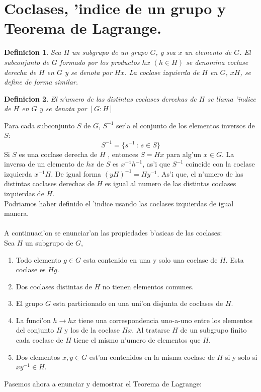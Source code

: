 \documentclass[a4paper,openright,12pt]{report}
\numberwithin{equation}{section} %
\newtheorem{definicion}{Definicion}[section] %
\begin{document}
\section{Coclases, 'indice de un grupo y Teorema de Lagrange.}
\begin{definicion}
Sea $H$ un subgrupo de un grupo $G$, y sea $x$ un elemento de $G$. El subconjunto de $G$ formado por los productos $hx$ $(h \in H)$ se denomina coclase derecha de $H$ en $G$ y se denota por $Hx$. La coclase izquierda de $H$ en $G$, $xH$, se define de forma similar. 
\end{definicion}
\begin{definicion}
El n'umero de las distintas coclases derechas de $H$ se llama 'indice de $H$ en $G$ y se denota por $[ G:H ]$
\end{definicion}
Para cada subconjunto $S$ de $G$, $S^{-1}$ ser'a el conjunto de los elementos inversos de $S$:
\[
S^{-1}= \{ s^{-1}\,:\, s \in S \}
\]
Si $S$ es una coclase derecha de $H$ , entonces $S=Hx$ para alg'un $x \in G$. La inversa de un elemento de $hx$ de $S$ es $x^{-1}h^{-1}$, as'i que $S^{-1}$  coincide con la coclase izquierda $x^{-1}H$. De igual forma $(yH)^{-1} = Hy^{-1}$. As'i que, el n'umero de las distintas coclases derechas de $H$ es igual al numero de las distintas coclases izquierdas de $H$.\\
Podriamos haber definido el 'indice usando las coclases izquierdas de igual manera.\\
\\
A continuaci'on se enunciar'an las propiedades b'asicas de las coclases:
\\
Sea $H$ un subgrupo de $G$,
\begin{enumerate}
\item Todo elemento $g \in G$ esta contenido en una y solo una coclase de $H$. Esta coclase es $Hg$.
\item Dos coclases distintas de $H$ no tienen elementos comunes.
\item El grupo $G$ esta particionado en una uni'on disjunta de coclases de $H$.
\item La funci'on $h \rightarrow hx$ tiene una correspondencia uno-a-uno entre los elementos del conjunto $H$ y los de la coclase $Hx$. Al tratarse $H$ de un subgrupo finito cada coclase de $H$ tiene el mismo n'umero de elementos que $H$.
\item Dos elementos $x,y \in G$ est'an contenidos en la misma coclase de $H$ si y solo si $xy^{-1}\in H$. 
\end{enumerate}
Pasemos ahora a enunciar y demostrar el Teorema de Lagrange:
\end{document}
